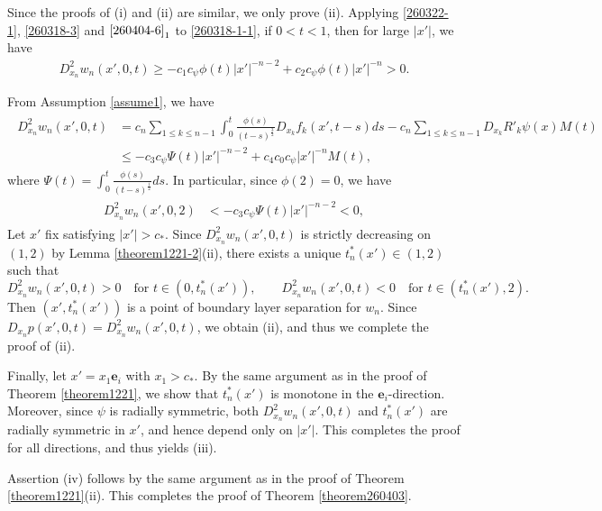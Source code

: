 \documentclass{amsart}
\numberwithin{equation}{section}
\newenvironment{pfthm-SS-19}{{\par\noindent
            \textbf{Proof of Theorem \ref{theorem260403}}\quad}}{\hfill $\square$}
\begin{document}
 
 \begin{pfthm-SS-19}
Since the proofs of (i) and (ii) are similar, we only prove (ii).   Applying  \eqref{260322-1},   \eqref{260318-3} and $\eqref{260404-6}_1$ to \eqref{260318-1-1},   if $ 0 < t< 1$, then for large $|x'|$, we have 
\begin{align*}%
D^2_{x_n} w_n (x',0,t) \geq    - c_1 c_\psi \phi(t)      |x'|^{-n-2} + c_2  c_\psi\phi(t)    |x'|^{-n } > 0.
\end{align*}


From   Assumption \ref{assume1},   we have 
  \begin{align*}%
\begin{split}
D_{x_n}^2 w_n(x',  0, t)  
 & =   c_n \sum_{1 \leq k \leq n-1}\int_0^t  \frac{ \phi(s)}{(t-s)^\frac32}    D_{x_k}  f_k (x', t-s) ds    -c_n  \sum_{1 \leq k \leq n-1} D_{x_k}  R'_k \psi(x) M(t)\\
&  \leq    - c_3 c_\psi \Psi(t)    |x'|^{-n-2} +   c_4 c_0  c_\psi |x'|^{-n } M(t), 
\end{split}
\end{align*}
where $\Psi(t) = \int_0^t \frac{\phi(s)}{(t -s)^\frac12} ds$. In particular,  since $\phi(2) =0$, we have 
\begin{align*}
\begin{split}
D_{x_n}^2 w_n(x',  0, 2)  &  <     - c_3 c_\psi \Psi(t)    |x'|^{-n-2}<0,
\end{split}
\end{align*}
Let $ x'$ fix satisfying $|x'| > c_*$.  Since $D_{x_n}^2 w_n(x',0,t)$ is strictly decreasing on $(1,2)$ by Lemma \ref{theorem1221-2}(ii), there exists a unique $t_n^*(x')\in(1,2)$ such that
\[
D_{x_n}^2 w_n(x',0,t)>0 \quad \text{for } t\in(0,t_n^*(x')),
\qquad
D_{x_n}^2 w_n(x',0,t)<0 \quad \text{for } t\in(t_n^*(x'),2).
\]
Then $(x',t_n^*(x'))$ is a point of boundary layer separation for $w_n$.
Since $D_{x_n}p(x',0,t)=D_{x_n}^2 w_n(x',0,t)$, we obtain (ii), and thus we complete the proof of (ii).

Finally, let $x' = x_1 \mathbf{e}_i$ with $x_1 > c_*$. By the same argument as in the proof of Theorem \ref{theorem1221}, we show that $t_n^*(x')$ is monotone in the $\mathbf{e}_i$-direction. Moreover, since $\psi$ is radially symmetric, both $D_{x_n}^2 w_n(x',0,t)$ and $t_n^*(x')$ are radially symmetric in $x'$, and hence depend only on $|x'|$. This completes the proof for all directions, and thus yields (iii).

Assertion (iv) follows by the same argument as in the proof of Theorem \ref{theorem1221}(ii). This completes the proof of Theorem \ref{theorem260403}.
\end{pfthm-SS-19}
\end{document}
